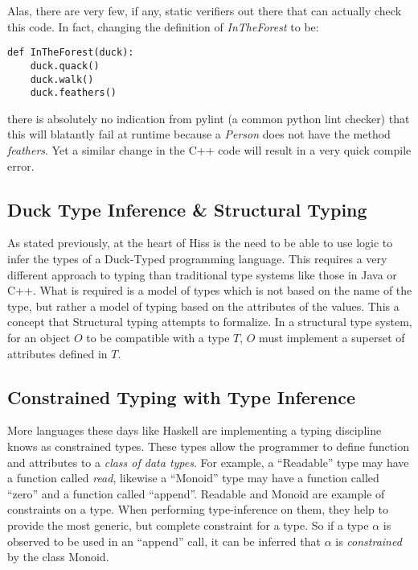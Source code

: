 \documentclass{scrartcl}
\begin{document}
\begin{multicols}{2}
Alas, there are very few, if any, static verifiers out there that can actually
check this code. In fact, changing the definition of \emph{InTheForest}
to be:

\begin{verbatim}
def InTheForest(duck):
    duck.quack()
    duck.walk()
    duck.feathers()
\end{verbatim}

there is absolutely no indication from pylint (a common python lint checker) that
this will blatantly fail at runtime because a \emph{Person} does not have the
method \emph{feathers}. Yet a similar change in the C++ code will result in a
very quick compile error.

\subsection*{Duck Type Inference \& Structural Typing}

As stated previously, at the heart of Hiss is the need to be able to use logic
to infer the types of a Duck-Typed programming language. This requires a very
different approach to typing than traditional type systems like those in Java
or C++. What is required is a model of types which is not based on the name of
the type, but rather a model of typing based on the attributes of the values.
This a concept that Structural typing attempts to formalize. In a structural
type system, for an object $O$ to be compatible with a type $T$, $O$ must implement
a superset of attributes defined in $T$.\cite{nst}

\subsection*{Constrained Typing with Type Inference}

More languages these days like Haskell are implementing a typing discipline
knows as constrained types. These types allow the programmer to define function
and attributes to a \emph{class of data types}. For example, a ``Readable'' type
may have a function called \emph{read}, likewise a ``Monoid'' type may have a
function called ``zero'' and a function called ``append''. Readable and Monoid are
example of constraints on a type. When performing type-inference on them, they
help to provide the most generic, but complete constraint for a type. So if a
type $\alpha$ is observed to be used in an ``append'' call, it can be inferred
that $\alpha$ is \emph{constrained} by the class Monoid.


\end{multicols}
\end{document}
